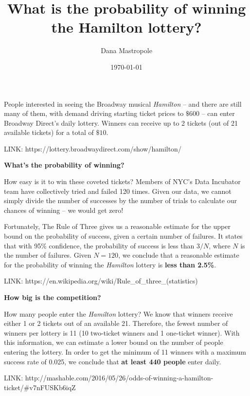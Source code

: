 \documentclass[12pt]{article}
\begin{document}
\title{What is the probability of winning the Hamilton lottery?}
\author{Dana Mastropole}
\date{\today}
\maketitle

People interested in seeing the Broadway musical \textit{Hamilton} -- and there are still many of them, with demand driving starting ticket prices to $\$600$ -- can enter Broadway Direct's daily lottery. Winners can receive up to 2 tickets (out of 21 available tickets) for a total of $\$10$.

LINK: https://lottery.broadwaydirect.com/show/hamilton/

\vspace{5mm}

\textbf{What's the probability of winning?}

How easy is it to win these coveted tickets? Members of NYC's Data Incubator team have collectively tried and failed 120 times. Given our data, we cannot simply divide the number of successes by the number of trials to calculate our chances of winning -- we would get zero!

Fortunately, The Rule of Three gives us a reasonable estimate for the upper bound on the probability of success, given a certain number of failures. It states that with 95\% confidence, the probability of success is less than $3/N$, where $N$ is the number of failures. Given $N = 120$, we conclude that a reasonable estimate for the probability of winning the \textit{Hamilton} lottery is \textbf{less than 2.5\%}.

LINK: https://en.wikipedia.org/wiki/Rule\_of\_three\_(statistics)

\vspace{5mm}

\textbf{How big is the competition?}

How many people enter the \textit{Hamilton} lottery? We know that winners receive either 1 or 2 tickets out of an available 21. Therefore, the fewest number of winners per lottery is 11 (10 two-ticket winners and 1 one-ticket winner). With this information, we can estimate a lower bound on the number of people entering the lottery. In order to get the minimum of 11 winners with a maximum success rate of 0.025, we conclude that \textbf{at least 440 people} enter daily.

LINK: http://mashable.com/2016/05/26/odds-of-winning-a-hamilton-ticket/#v7nFUSKb6iqZ
\end{document}

